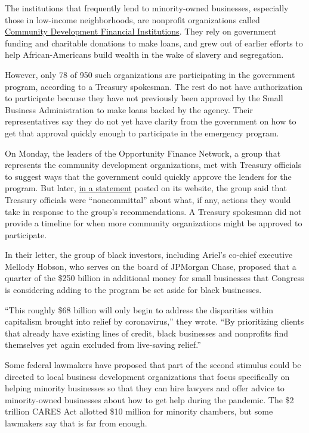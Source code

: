 The institutions that frequently lend to minority-owned businesses,
especially those in low-income neighborhoods, are nonprofit
organizations called
\href{https://www.nytimes3xbfgragh.onion/2020/06/04/business/minority-businesses-damage-lenders.html}{Community
Development Financial Institutions}. They rely on government funding and
charitable donations to make loans, and grew out of earlier efforts to
help African-Americans build wealth in the wake of slavery and
segregation.

However, only 78 of 950 such organizations are participating in the
government program, according to a Treasury spokesman. The rest do not
have authorization to participate because they have not previously been
approved by the Small Business Administration to make loans backed by
the agency. Their representatives say they do not yet have clarity from
the government on how to get that approval quickly enough to participate
in the emergency program.

On Monday, the leaders of the Opportunity Finance Network, a group that
represents the community development organizations, met with Treasury
officials to suggest ways that the government could quickly approve the
lenders for the program. But later,
\href{https://ofn.org/articles/paycheck-protection-program-update-cdfi-eligibility}{in
a statement} posted on its website, the group said that Treasury
officials were ``noncommittal'' about what, if any, actions they would
take in response to the group's recommendations. A Treasury spokesman
did not provide a timeline for when more community organizations might
be approved to participate.

In their letter, the group of black investors, including Ariel's
co-chief executive Mellody Hobson, who serves on the board of JPMorgan
Chase, proposed that a quarter of the \$250 billion in additional money
for small businesses that Congress is considering adding to the program
be set aside for black businesses.

``This roughly \$68 billion will only begin to address the disparities
within capitalism brought into relief by coronavirus,'' they wrote. ``By
prioritizing clients that already have existing lines of credit, black
businesses and nonprofits find themselves yet again excluded from
live-saving relief.''

Some federal lawmakers have proposed that part of the second stimulus
could be directed to local business development organizations that focus
specifically on helping minority businesses so that they can hire
lawyers and offer advice to minority-owned businesses about how to get
help during the pandemic. The \$2 trillion CARES Act allotted \$10
million for minority chambers, but some lawmakers say that is far from
enough.


